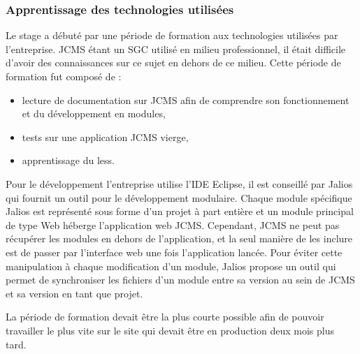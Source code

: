 \documentclass[12pt,a4paper]{article}
\begin{document}
\subsubsection{Apprentissage des technologies utilisées}
Le stage a débuté par une période de formation aux technologies utilisées par l'entreprise. \gls{JCMS} étant un SGC utilisé en milieu professionnel, il était difficile d'avoir des connaissances sur ce sujet en dehors de ce milieu. Cette période de formation fut composé de :
\begin{itemize}
\item lecture de documentation sur \gls{JCMS} afin de comprendre son fonctionnement et du développement en modules,
\item tests sur une application \gls{JCMS} vierge,
\item apprentissage du less.
\end{itemize}\par 
Pour le développement l'entreprise utilise l'IDE Eclipse, il est conseillé par Jalios qui fournit un outil pour le développement modulaire. Chaque module spécifique Jalios est représenté sous forme d'un projet à part entière et un module principal de type Web héberge l'application web \gls{JCMS}. Cependant, \gls{JCMS} ne peut pas récupérer les modules en dehors de l'application, et la seul manière de les inclure est de passer par l'interface web une fois l'application lancée. Pour éviter cette manipulation à chaque modification d'un module, Jalios propose un outil qui permet de synchroniser les fichiers d'un module entre sa version au sein de \gls{JCMS} et sa version en tant que projet.\par
La période de formation devait être la plus courte possible afin de pouvoir travailler le plus vite sur le site qui devait être en production deux mois plus tard. \par
\end{document}
